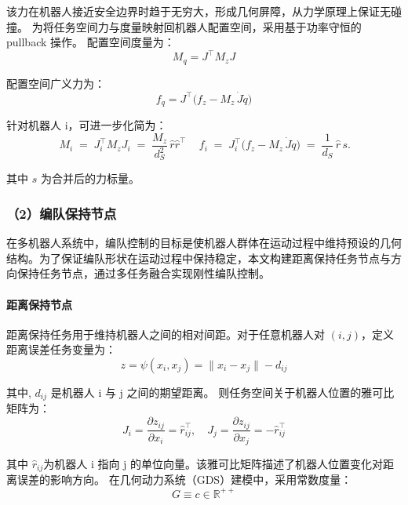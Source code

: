该力在机器人接近安全边界时趋于无穷大，形成几何屏障，从力学原理上保证无碰撞。
为将任务空间力与度量映射回机器人配置空间，采用基于功率守恒的 pullback 操作。
配置空间度量为：
\begin{equation}
    M_q = J^\top M_z J
\end{equation}

配置空间广义力为：
\begin{equation}
    f_q = J^\top\big(f_z - M_z\,\dot J\dot q\big)
\end{equation}

针对机器人 i，可进一步化简为：
\begin{equation}
    \,M_i \;=\; J_i^\top M_z J_i \;=\; \frac{M_z}{d_S^2}\,\hat r\hat r^\top \quad \,f_i \;=\; J_i^\top\big(f_z - M_z\,\dot J\dot q\big) \;=\; \frac{1}{d_S}\,\hat r\,s.
\end{equation}

其中 $s$ 为合并后的力标量。

\subsubsection{（2）编队保持节点}
在多机器人系统中，编队控制的目标是使机器人群体在运动过程中维持预设的几何结构。为了保证编队形状在运动过程中保持稳定，本文构建距离保持任务节点与方向保持任务节点，通过多任务融合实现刚性编队控制。

\paragraph{距离保持节点}
距离保持任务用于维持机器人之间的相对间距。对于任意机器人对 $(i,j)$，定义距离误差任务变量为：
\begin{equation}
    z = \psi(x_i, x_j) = \|x_i - x_j\| - d_{ij}
\end{equation}

其中, $d_{ij}$ 是机器人 i 与 j 之间的期望距离。
则任务空间关于机器人位置的雅可比矩阵为：
\begin{equation}
    J_i = \frac{\partial z_{ij}}{\partial x_i} = \hat r_{ij}^\top, \quad J_j = \frac{\partial z_{ij}}{\partial x_j} = -\hat r_{ij}^\top
\end{equation}

其中 $\hat r_{ij}$为机器人 i 指向 j 的单位向量。该雅可比矩阵描述了机器人位置变化对距离误差的影响方向。
在几何动力系统（GDS）建模中，采用常数度量：
\begin{equation}
    G \equiv c \in \mathbb{R}^{++}
\end{equation}

